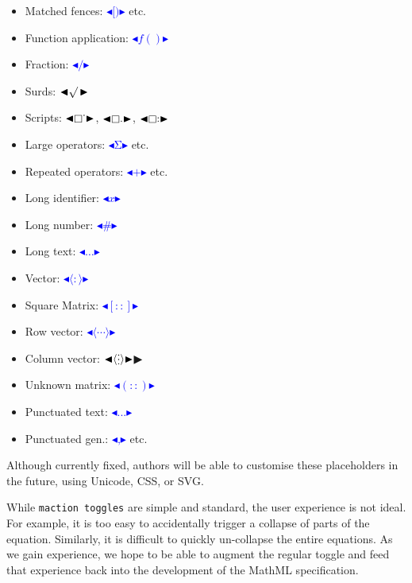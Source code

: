 \documentclass{llncs}
\def\collapse#1{\textcolor{blue}{\ensuremath{\mathord{\blacktriangleleft}\mathord{#1}
\mathord{\blacktriangleright}}}}
\begin{document}
\noindent\begin{minipage}[t]{.34\linewidth}
  \begin{itemize}
  \item Matched fences: \collapse{[)} etc.
  \item Function application: \collapse{f()}
  \item Fraction: \collapse{/}
  \item Surds: \collapse{\raise2pt\hbox{$\sqrt{}$}\,}
  \item Scripts: \collapse{\lower1pt\hbox{$\square$}\raise1.2ex\hbox{.}},
    \collapse{\lower1pt\hbox{$\square$}\text{.}},
    \collapse{\lower1pt\hbox{$\square$}\text{:}}
  \item Large operators: \collapse{\mathrm{\Sigma}} etc.
  \end{itemize}
\end{minipage}
\begin{minipage}[t]{.34\linewidth}
  \begin{itemize}
  \item Repeated operators: \collapse{+} etc.
  \item Long identifier: \collapse{\text{x}}
  \item Long number: \collapse{\#}
  \item Long text: \collapse{\ldots}
  \item Vector: \collapse{\langle:\rangle}
  \item Square Matrix: \collapse{[::]}
  \end{itemize}
\end{minipage}
\begin{minipage}[t]{.32\linewidth}
  \begin{itemize}
  \item Row vector: \collapse{\langle\cdots\rangle}
  \item Column vector:
    \collapse{\langle\smash{\lower2pt\hbox{$\vdots$}}\rangle}▶
  \item Unknown matrix: \collapse{(::)}
  \item Punctuated text: \collapse{...}
  \item Punctuated gen.: \collapse{,} etc.
  \end{itemize}
\end{minipage}\vspace{1ex}

Although currently fixed, authors will be able to customise these placeholders
in the future, using Unicode, CSS, or SVG.

While \texttt{maction toggles} are simple and standard, the user 
experience is not ideal. For example, it is too easy to accidentally 
trigger a collapse of parts of the equation. Similarly, it is difficult to 
quickly un-collapse the entire equations. As we gain experience, we hope to be 
able to augment the regular toggle and feed that experience back into the 
development of the MathML specification.
\end{document}

